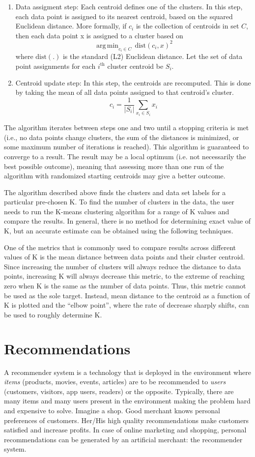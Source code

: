 \documentclass{book}
\DeclareMathOperator*{\argmin}{arg\,min}
\begin{document}
\begin{enumerate}
\item Data assigment step: Each centroid defines one of the clusters. In this step, each data point is assigned to its nearest centroid, based on the squared Euclidean distance. More formally, if $c_i$ is the collection of centroids in set $C$, then each data point x is assigned to a cluster based on
\[ \argmin_{c_i \in C} \, \mbox{dist}(c_i,x)^2\]
where $\mbox{dist}(.)$ is the standard (L2) Euclidean distance. Let the set of data point assignments for each $i^{\mbox{th}}$ cluster centroid be $S_i$.
\item Centroid update step: In this step, the centroids are recomputed. This is done by taking the mean of all data points assigned to that centroid's cluster.
\[ c_i = \frac{1}{|S_i|}\sum_{x_i \in S_i}x_i\]
\end{enumerate}

The algorithm iterates between steps one and two until a stopping criteria is met (i.e., no data points change clusters, the sum of the distances is minimized, or some maximum number of iterations is reached).
This algorithm is guaranteed to converge to a result. The result may be a local optimum (i.e. not necessarily the best possible outcome), meaning that assessing more than one run of the algorithm with randomized starting centroids may give a better outcome.

The algorithm described above finds the clusters and data set labels for a particular pre-chosen K. To find the number of clusters in the data, the user needs to run the K-means clustering algorithm for a range of K values and compare the results. In general, there is no method for determining exact value of K, but an accurate estimate can be obtained using the following techniques.

One of the metrics that is commonly used to compare results across different values of K is the mean distance between data points and their cluster centroid. Since increasing the number of clusters will always reduce the distance to data points, increasing K will always decrease this metric, to the extreme of reaching zero when K is the same as the number of data points. Thus, this metric cannot be used as the sole target. Instead, mean distance to the centroid as a function of K is plotted and the ``elbow point'', where the rate of decrease sharply shifts, can be used to roughly determine K.

\chapter{Recommendations}
A recommender system is a technology that is deployed in the environment where \emph{items} (products, movies, events, articles) are to be recommended to \emph{users} (customers, visitors, app users, readers) or the opposite. Typically, there are many items and many users present in the environment making the problem hard and expensive to solve. Imagine a shop. Good merchant knows personal preferences of customers. Her/His high quality recommendations make customers satisfied and increase profits. In case of online marketing and shopping, personal recommendations can be generated by an artificial merchant: the recommender system.
\end{document}
